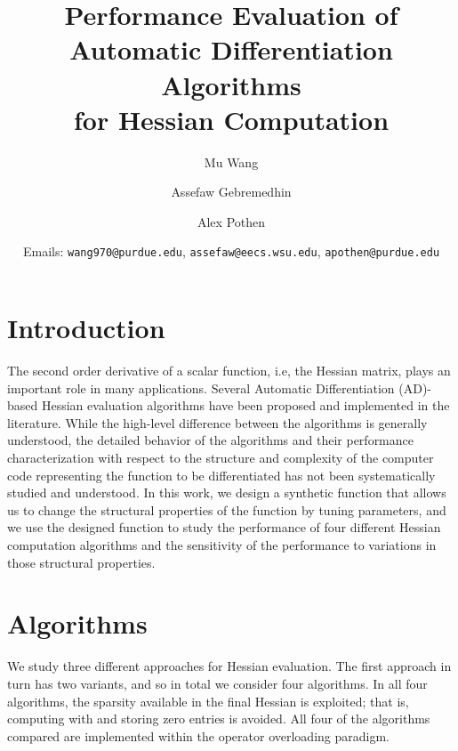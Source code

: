 \documentclass[10pt, a4paper, english]{article}
\begin{document}
\title{Performance Evaluation of Automatic Differentiation Algorithms \\ for Hessian Computation}
\author[1]{Mu Wang}
\author[2]{Assefaw Gebremedhin}
\author[1]{Alex Pothen}
\vspace{-15mm}
\date{Emails:  \texttt{wang970@purdue.edu}, \texttt{assefaw@eecs.wsu.edu},
\texttt{apothen@purdue.edu}}
\maketitle

\section*{Introduction}
The second order derivative of a scalar function, i.e, the Hessian matrix, plays 
an important role in many applications. 
Several Automatic Differentiation (AD)-based Hessian evaluation algorithms have been proposed and implemented in the literature. While the high-level difference between the algorithms is generally understood, the detailed behavior of the algorithms and their performance characterization with respect to the structure and complexity of the computer code  representing the function to be differentiated has not been systematically studied and understood. In this work, we design a synthetic function that allows us to change the structural properties of the function by tuning parameters, and we use the designed function to study the performance of four different Hessian computation algorithms and the sensitivity of the performance to variations in those structural properties.

\section*{Algorithms}

We study three different approaches for Hessian evaluation. The first approach in turn has two variants, and so in total we consider four algorithms. In all four algorithms, 
the sparsity available in the final Hessian is exploited; that is, computing with and storing zero entries is avoided. All four of the algorithms compared are implemented within the operator overloading paradigm. 
\end{document}
